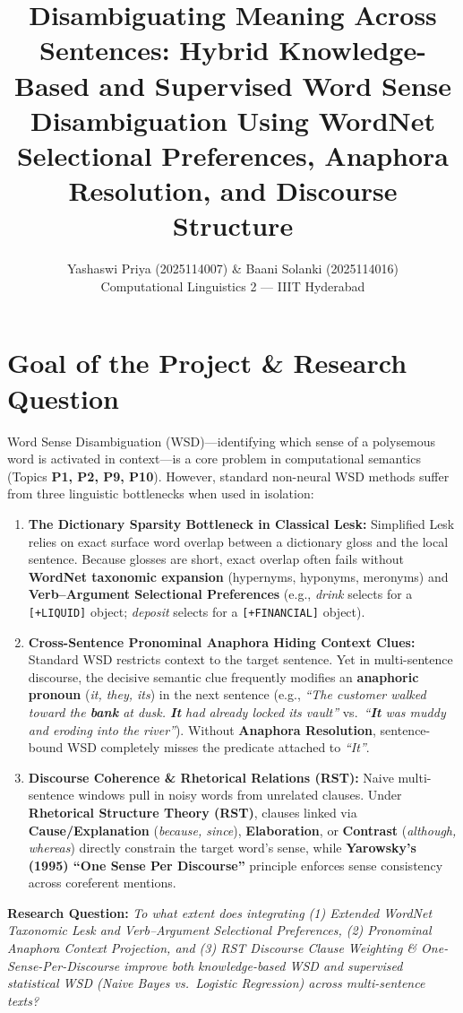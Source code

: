 \documentclass[11pt,a4paper]{article}
\title{\vspace{-1.2cm}\textbf{\Large Disambiguating Meaning Across Sentences: Hybrid Knowledge-Based and Supervised Word Sense Disambiguation Using WordNet Selectional Preferences, Anaphora Resolution, and Discourse Structure}\vspace{-0.3cm}}
\author{
    Yashaswi Priya (2025114007) \quad \& \quad Baani Solanki (2025114016) \\
    \small Computational Linguistics 2 --- IIIT Hyderabad
}
\date{\vspace{-0.5cm}}
\begin{document}
\maketitle

\section{Goal of the Project \& Research Question}
Word Sense Disambiguation (WSD)---identifying which sense of a polysemous word is activated in context---is a core problem in computational semantics (Topics \textbf{P1, P2, P9, P10}). However, standard non-neural WSD methods suffer from three linguistic bottlenecks when used in isolation:
\begin{enumerate}
    \item \textbf{The Dictionary Sparsity Bottleneck in Classical Lesk:} Simplified Lesk relies on exact surface word overlap between a dictionary gloss and the local sentence. Because glosses are short, exact overlap often fails without \textbf{WordNet taxonomic expansion} (hypernyms, hyponyms, meronyms) and \textbf{Verb--Argument Selectional Preferences} (e.g., \textit{drink} selects for a \texttt{[+LIQUID]} object; \textit{deposit} selects for a \texttt{[+FINANCIAL]} object).
    \item \textbf{Cross-Sentence Pronominal Anaphora Hiding Context Clues:} Standard WSD restricts context to the target sentence. Yet in multi-sentence discourse, the decisive semantic clue frequently modifies an \textbf{anaphoric pronoun} (\textit{it, they, its}) in the next sentence (e.g., \textit{``The customer walked toward the \textbf{bank} at dusk. \textbf{It} had already locked its vault''} vs.\ \textit{``\textbf{It} was muddy and eroding into the river''}). Without \textbf{Anaphora Resolution}, sentence-bound WSD completely misses the predicate attached to \textit{``It''}.
    \item \textbf{Discourse Coherence \& Rhetorical Relations (RST):} Naive multi-sentence windows pull in noisy words from unrelated clauses. Under \textbf{Rhetorical Structure Theory (RST)}, clauses linked via \textbf{Cause/Explanation} (\textit{because, since}), \textbf{Elaboration}, or \textbf{Contrast} (\textit{although, whereas}) directly constrain the target word's sense, while \textbf{Yarowsky's (1995) ``One Sense Per Discourse''} principle enforces sense consistency across coreferent mentions.
\end{enumerate}
\textbf{Research Question:} \textit{To what extent does integrating (1) Extended WordNet Taxonomic Lesk and Verb--Argument Selectional Preferences, (2) Pronominal Anaphora Context Projection, and (3) RST Discourse Clause Weighting \& One-Sense-Per-Discourse improve both knowledge-based WSD and supervised statistical WSD (Naive Bayes vs.\ Logistic Regression) across multi-sentence texts?}
\end{document}
